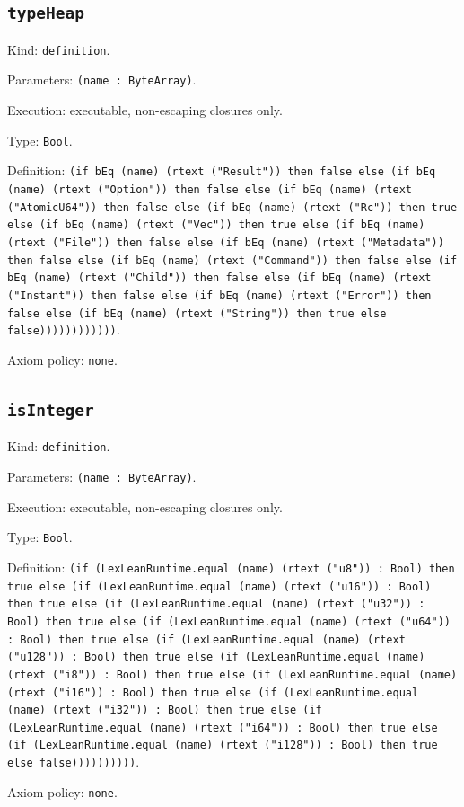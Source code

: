 \documentclass[11pt]{article}
\begin{document}
\subsection*{\texttt{typeHeap}}
\noindent Kind: \texttt{definition}.\par
\noindent Parameters: \texttt{(name : ByteArray)}.\par
\noindent Execution: executable, non-escaping closures only.\par
\noindent Type: \texttt{Bool}.\par
\noindent Definition: \texttt{(if bEq (name) (rtext ("Result")) then false else (if bEq (name) (rtext ("Option")) then false else (if bEq (name) (rtext ("AtomicU64")) then false else (if bEq (name) (rtext ("Rc")) then true else (if bEq (name) (rtext ("Vec")) then true else (if bEq (name) (rtext ("File")) then false else (if bEq (name) (rtext ("Metadata")) then false else (if bEq (name) (rtext ("Command")) then false else (if bEq (name) (rtext ("Child")) then false else (if bEq (name) (rtext ("Instant")) then false else (if bEq (name) (rtext ("Error")) then false else (if bEq (name) (rtext ("String")) then true else false))))))))))))}.\par
\noindent Axiom policy: \texttt{none}.\par
\subsection*{\texttt{isInteger}}
\noindent Kind: \texttt{definition}.\par
\noindent Parameters: \texttt{(name : ByteArray)}.\par
\noindent Execution: executable, non-escaping closures only.\par
\noindent Type: \texttt{Bool}.\par
\noindent Definition: \texttt{(if (LexLeanRuntime.equal (name) (rtext ("u8")) : Bool) then true else (if (LexLeanRuntime.equal (name) (rtext ("u16")) : Bool) then true else (if (LexLeanRuntime.equal (name) (rtext ("u32")) : Bool) then true else (if (LexLeanRuntime.equal (name) (rtext ("u64")) : Bool) then true else (if (LexLeanRuntime.equal (name) (rtext ("u128")) : Bool) then true else (if (LexLeanRuntime.equal (name) (rtext ("i8")) : Bool) then true else (if (LexLeanRuntime.equal (name) (rtext ("i16")) : Bool) then true else (if (LexLeanRuntime.equal (name) (rtext ("i32")) : Bool) then true else (if (LexLeanRuntime.equal (name) (rtext ("i64")) : Bool) then true else (if (LexLeanRuntime.equal (name) (rtext ("i128")) : Bool) then true else false))))))))))}.\par
\noindent Axiom policy: \texttt{none}.\par
\end{document}
